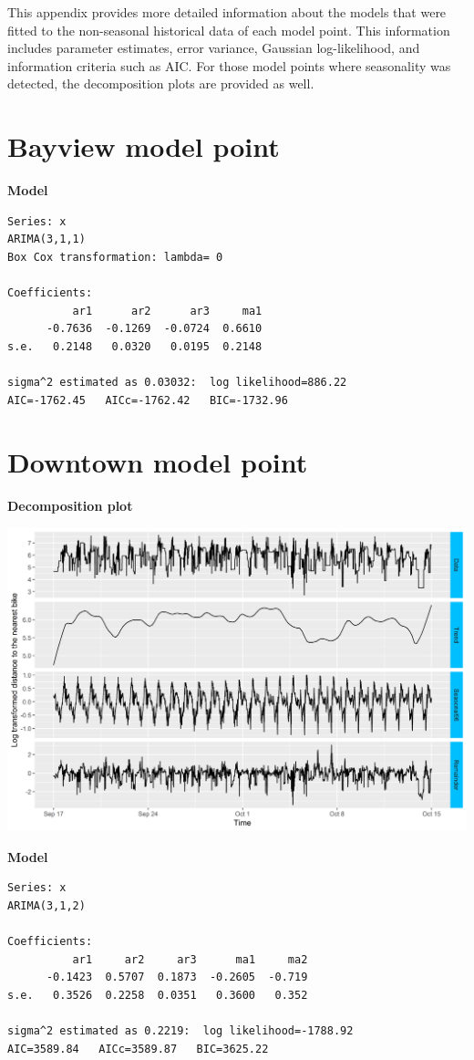 \documentclass[12pt,oneside]{reedthesis}
\begin{document}
This appendix provides more detailed information about the models that
were fitted to the non-seasonal historical data of each model point.
This information includes parameter estimates, error variance, Gaussian
log-likelihood, and information criteria such as AIC. For those model
points where seasonality was detected, the decomposition plots are
provided as well.

\section{Bayview model point}\label{bayview-model-point}

\textbf{Model}
\begin{verbatim}
Series: x 
ARIMA(3,1,1) 
Box Cox transformation: lambda= 0 

Coefficients:
          ar1      ar2      ar3     ma1
      -0.7636  -0.1269  -0.0724  0.6610
s.e.   0.2148   0.0320   0.0195  0.2148

sigma^2 estimated as 0.03032:  log likelihood=886.22
AIC=-1762.45   AICc=-1762.42   BIC=-1732.96
\end{verbatim}
\newpage

\section{Downtown model point}\label{downtown-model-point}

\textbf{Decomposition plot}

\includegraphics[width=\textwidth]{Figures/stlplot_model2}

\textbf{Model}
\begin{verbatim}
Series: x 
ARIMA(3,1,2) 

Coefficients:
          ar1     ar2     ar3      ma1     ma2
      -0.1423  0.5707  0.1873  -0.2605  -0.719
s.e.   0.3526  0.2258  0.0351   0.3600   0.352

sigma^2 estimated as 0.2219:  log likelihood=-1788.92
AIC=3589.84   AICc=3589.87   BIC=3625.22
\end{verbatim}
\newpage
\end{document}
